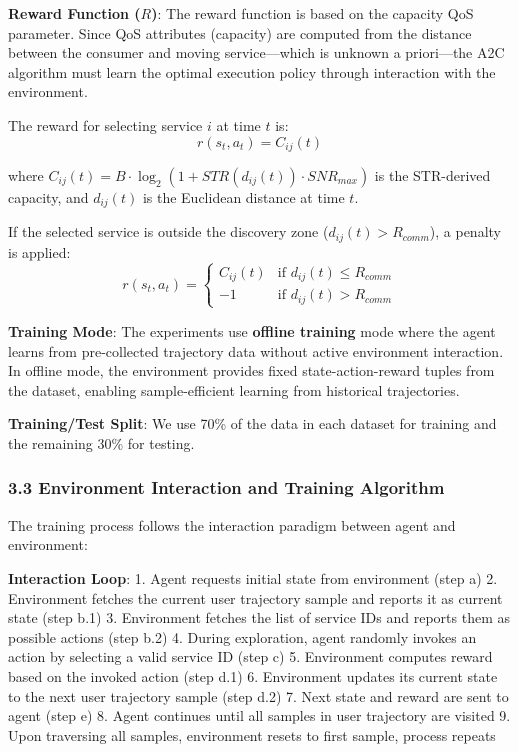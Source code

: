\textbf{Reward Function (\(R\))}: The reward function is based on the
capacity QoS parameter. Since QoS attributes (capacity) are computed
from the distance between the consumer and moving service---which is
unknown a priori---the A2C algorithm must learn the optimal execution
policy through interaction with the environment.

The reward for selecting service \(i\) at time \(t\) is:
\[r(s_t, a_t) = C_{ij}(t)\]

where \(C_{ij}(t) = B \cdot \log_2(1 + STR(d_{ij}(t)) \cdot SNR_{max})\)
is the STR-derived capacity, and \(d_{ij}(t)\) is the Euclidean distance
at time \(t\).

If the selected service is outside the discovery zone
(\(d_{ij}(t) > R_{comm}\)), a penalty is applied:
\[r(s_t, a_t) = \begin{cases} C_{ij}(t) & \text{if } d_{ij}(t) \leq R_{comm} \\ -1 & \text{if } d_{ij}(t) > R_{comm} \end{cases}\]

\textbf{Training Mode}: The experiments use \textbf{offline training}
mode where the agent learns from pre-collected trajectory data without
active environment interaction. In offline mode, the environment
provides fixed state-action-reward tuples from the dataset, enabling
sample-efficient learning from historical trajectories.

\textbf{Training/Test Split}: We use 70\% of the data in each dataset
for training and the remaining 30\% for testing.

\hypertarget{environment-interaction-and-training-algorithm}{%
	\subsubsection{3.3 Environment Interaction and Training
		Algorithm}\label{environment-interaction-and-training-algorithm}}

The training process follows the interaction paradigm between agent and
environment:

\textbf{Interaction Loop}: 1. Agent requests initial state from
environment (step a) 2. Environment fetches the current user trajectory
sample and reports it as current state (step b.1) 3. Environment fetches
the list of service IDs and reports them as possible actions (step b.2)
4. During exploration, agent randomly invokes an action by selecting a
valid service ID (step c) 5. Environment computes reward based on the
invoked action (step d.1) 6. Environment updates its current state to
the next user trajectory sample (step d.2) 7. Next state and reward are
sent to agent (step e) 8. Agent continues until all samples in user
trajectory are visited 9. Upon traversing all samples, environment
resets to first sample, process repeats

